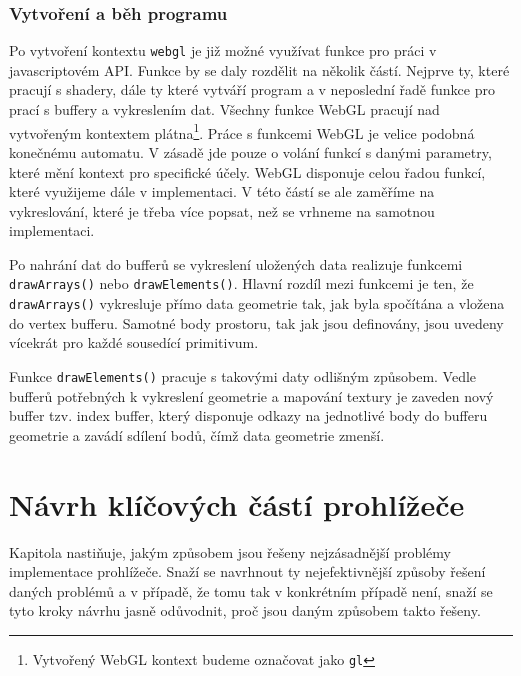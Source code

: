 \newpage

\subsection{Vytvoření a běh programu}
Po vytvoření kontextu \texttt{webgl} je již možné využívat funkce pro práci v javascriptovém API. Funkce by se daly rozdělit na několik částí. Nejprve ty, které pracují s shadery, dále ty které vytváří program a v neposlední řadě funkce pro prací s buffery a vykreslením dat. Všechny funkce WebGL pracují nad vytvořeným kontextem plátna\footnote{Vytvořený WebGL kontext budeme označovat jako \texttt{gl}}. Práce s funkcemi WebGL je velice podobná konečnému automatu. V zásadě jde pouze o volání funkcí s danými parametry, které mění kontext pro specifické účely. WebGL disponuje celou řadou funkcí, které využijeme dále v implementaci. V této částí se ale zaměříme na vykreslování, které je třeba více popsat, než se vrhneme na samotnou implementaci. 

Po nahrání dat do bufferů se vykreslení uložených data realizuje funkcemi \texttt{drawArrays()} nebo \texttt{drawElements()}. Hlavní rozdíl mezi funkcemi je ten, že \texttt{drawArrays()} vykresluje přímo data geometrie tak,  jak byla spočítána a vložena do vertex bufferu. Samotné body prostoru, tak jak jsou definovány, jsou uvedeny vícekrát pro každé sousedící primitivum.

Funkce \texttt{drawElements()} pracuje s takovými daty odlišným způsobem. Vedle bufferů potřebných k vykreslení geometrie a mapování textury je zaveden nový buffer tzv. index buffer, který disponuje odkazy na jednotlivé body do bufferu geometrie a zavádí sdílení bodů, čímž data geometrie zmenší. 

 



\newpage

\chapter{Návrh klíčových částí prohlížeče}
\label{chapter:3}
Kapitola nastiňuje, jakým způsobem jsou řešeny nejzásadnější problémy implementace prohlížeče. Snaží se navrhnout ty nejefektivnější způsoby řešení daných problémů a v případě, že tomu tak v konkrétním případě není, snaží se tyto  kroky návrhu jasně odůvodnit, proč jsou  daným způsobem takto řešeny.


